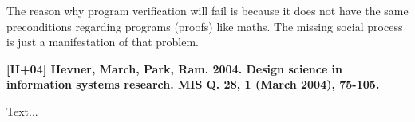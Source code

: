 \documentclass[a4paper,12pt,english]{scrartcl}
\begin{document}
The reason why program verification will fail is because it does not have the
same preconditions regarding programs (proofs) like maths. The missing social
process is just a manifestation of that problem.

\vspace{8mm}

\noindent
\textbf{\textsf{{\large [H+04] Hevner, March, Park, Ram. 2004. Design science in information systems research. MIS Q. 28, 1 (March 2004), 75-105.}}}
\vspace{2mm}

Text...
\end{document}
